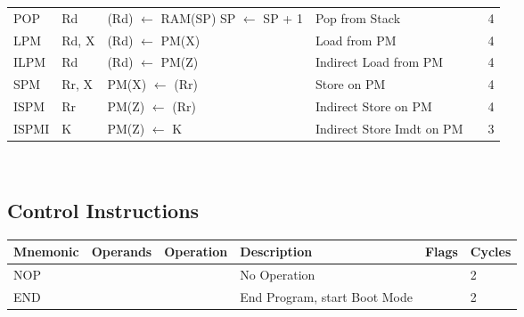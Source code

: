 \begin{footnotesize}
\begin{tabular}{|p{14.5mm}|p{14mm}|p{47mm}|p{46.5mm}|p{14mm}|p{10mm}|}
    POP      & Rd        & (Rd) $\leftarrow$ RAM(SP) \newline SP $\leftarrow$ SP + 1              & Pop from Stack                            &                & 4      \\
    LPM      & Rd, X     & (Rd) $\leftarrow$ PM(X)                                                & Load from PM                              &                & 4      \\
    ILPM     & Rd        & (Rd) $\leftarrow$ PM(Z)                                                & Indirect Load from PM                     &                & 4      \\
    SPM      & Rr, X     & PM(X) $\leftarrow$ (Rr)                                                & Store on PM                               &                & 4      \\
    ISPM     & Rr        & PM(Z) $\leftarrow$ (Rr)                                                & Indirect Store on PM                      &                & 4      \\
    ISPMI    & K         & PM(Z) $\leftarrow$ K                                                   & Indirect Store Imdt on PM                 &                & 3      \\
    \hline
\end{tabular}\\
\subsection{Control Instructions}
\begin{tabular}{|p{14.5mm}|p{14mm}|p{47mm}|p{46.5mm}|p{14mm}|p{10mm}|}
    \rowcolor{gray!50}
    \hline
    Mnemonic & Operands  & Operation                                                              & Description & Flags & Cycles \\ \hline
    NOP      &           &                                                                        & No Operation                              &                & 2      \\
    END      &           &                                                                        & End Program, start Boot Mode              &                & 2      \\
    \hline
\end{tabular}~\\


\end{footnotesize}
